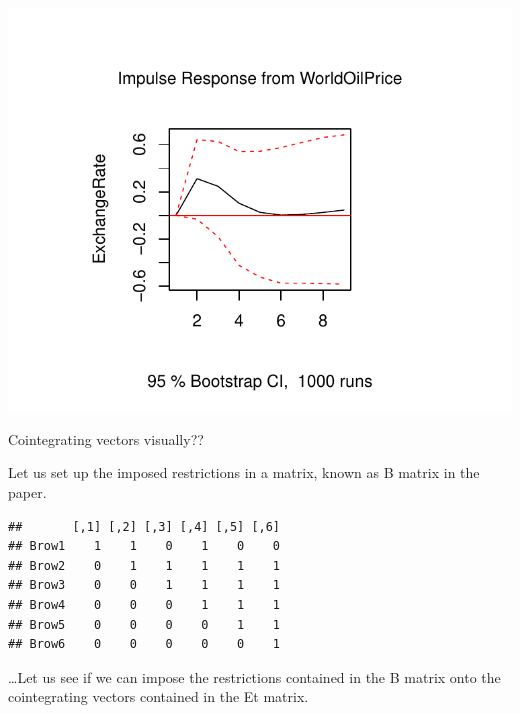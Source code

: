 \documentclass[11pt,preprint, authoryear]{elsarticle}
\numberwithin{equation}{section}
\numberwithin{figure}{section}
\numberwithin{table}{section}
\begin{document}
\begin{center}\includegraphics{README_files/figure-latex/unnamed-chunk-8-5} \end{center}

Cointegrating vectors visually??

Let us set up the imposed restrictions in a matrix, known as B matrix in
the paper.

\begin{verbatim}
##       [,1] [,2] [,3] [,4] [,5] [,6]
## Brow1    1    1    0    1    0    0
## Brow2    0    1    1    1    1    1
## Brow3    0    0    1    1    1    1
## Brow4    0    0    0    1    1    1
## Brow5    0    0    0    0    1    1
## Brow6    0    0    0    0    0    1
\end{verbatim}

\ldots Let us see if we can impose the restrictions contained in the B
matrix onto the cointegrating vectors contained in the Et matrix.
\end{document}

